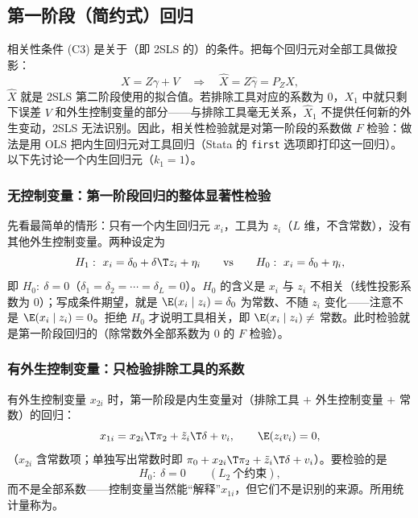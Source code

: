 \subsection{第一阶段（简约式）回归}

相关性条件 (C3) 是关于（即 2SLS 的）的条件。把每个回归元对全部工具做投影：
\[
X=Z\gamma+V\quad\Longrightarrow\quad \hat X=Z\hat\gamma=P_ZX ,
\]
$\hat X$ 就是 2SLS 第二阶段使用的拟合值。若排除工具对应的系数为 0，$X_1$ 中就只剩下误差 $V$ 和外生控制变量的部分——与排除工具毫无关系，$\hat X_1$ 不提供任何新的外生变动，2SLS 无法识别。因此，相关性检验就是对第一阶段的系数做 $F$ 检验：做法是用 OLS 把内生回归元对工具回归（Stata 的 \texttt{first} 选项即打印这一回归）。以下先讨论一个内生回归元（$k_1=1$）。

\subsubsection{无控制变量：第一阶段回归的整体显著性检验}

先看最简单的情形：只有一个内生回归元 $x_i$，工具为 $z_i$（$L$ 维，不含常数），没有其他外生控制变量。两种设定为
\[
H_1:\ x_i=\delta_0+\delta\T z_i+\eta_i
\qquad\text{vs}\qquad
H_0:\ x_i=\delta_0+\eta_i ,
\]
即 $H_0:\ \delta=0$（$\delta_1=\delta_2=\cdots=\delta_L=0$）。$H_0$ 的含义是 $x_i$ 与 $z_i$ 不相关（线性投影系数为 0）；写成条件期望，就是 $\E(x_i\mid z_i)=\delta_0$ 为常数、不随 $z_i$ 变化——注意不是 $\E(x_i\mid z_i)=0$。拒绝 $H_0$ 才说明工具相关，即 $\E(x_i\mid z_i)\neq$ 常数。此时检验就是第一阶段回归的（除常数外全部系数为 0 的 $F$ 检验）。

\subsubsection{有外生控制变量：只检验排除工具的系数}

有外生控制变量 $x_{2i}$ 时，第一阶段是内生变量对（排除工具 $+$ 外生控制变量 $+$ 常数）的回归：
\begin{equation}\label{eq:U09-firststage}
x_{1i}=x_{2i}\T\pi_2+\tilde z_i\T\delta+v_i ,\qquad \E(z_iv_i)=0 ,
\end{equation}
（$x_{2i}$ 含常数项；单独写出常数时即 $\pi_0+x_{2i}\T\pi_2+\tilde z_i\T\delta+v_i$）。要检验的是
\[
H_0:\ \delta=0\qquad(L_2\ \text{个约束}),
\]
而不是全部系数——控制变量当然能“解释”$x_{1i}$，但它们不是识别的来源。所用统计量称为。

